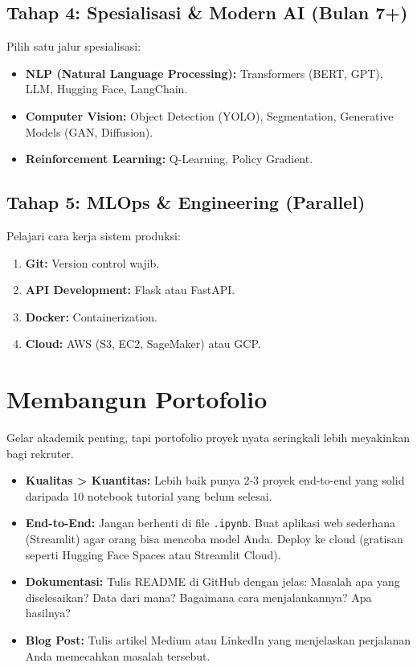 \subsection{Tahap 4: Spesialisasi \& Modern AI (Bulan 7+)}
Pilih satu jalur spesialisasi:
\begin{itemize}
    \item \textbf{NLP (Natural Language Processing):} Transformers (BERT, GPT), LLM, Hugging Face, LangChain.
    \item \textbf{Computer Vision:} Object Detection (YOLO), Segmentation, Generative Models (GAN, Diffusion).
    \item \textbf{Reinforcement Learning:} Q-Learning, Policy Gradient.
\end{itemize}

\subsection{Tahap 5: MLOps \& Engineering (Parallel)}
Pelajari cara kerja sistem produksi:
\begin{enumerate}
    \item \textbf{Git:} Version control wajib.
    \item \textbf{API Development:} Flask atau FastAPI.
    \item \textbf{Docker:} Containerization.
    \item \textbf{Cloud:} AWS (S3, EC2, SageMaker) atau GCP.
\end{enumerate}

\section{Membangun Portofolio}

Gelar akademik penting, tapi portofolio proyek nyata seringkali lebih meyakinkan bagi rekruter.
\begin{itemize}
    \item \textbf{Kualitas > Kuantitas:} Lebih baik punya 2-3 proyek end-to-end yang solid daripada 10 notebook tutorial yang belum selesai.
    \item \textbf{End-to-End:} Jangan berhenti di file \texttt{.ipynb}. Buat aplikasi web sederhana (Streamlit) agar orang bisa mencoba model Anda. Deploy ke cloud (gratisan seperti Hugging Face Spaces atau Streamlit Cloud).
    \item \textbf{Dokumentasi:} Tulis README di GitHub dengan jelas: Masalah apa yang diselesaikan? Data dari mana? Bagaimana cara menjalankannya? Apa hasilnya?
    \item \textbf{Blog Post:} Tulis artikel Medium atau LinkedIn yang menjelaskan perjalanan Anda memecahkan masalah tersebut.
\end{itemize}

